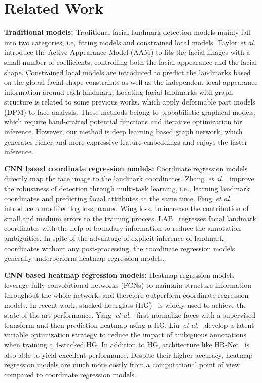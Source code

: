 \documentclass[runningheads]{llncs}
\begin{document}
\section{Related Work}
\textbf{Traditional models:} Traditional facial landmark detection models mainly fall into two categories, i.e, fitting models and constrained local models. Taylor \textit{et al.} introduce the Active Appearance Model (AAM) \cite{aam1}\cite{aam2} to fits the facial images with a small number of coefficients, controlling both the facial appearance and the facial shape. Constrained local models\cite{cls1}\cite{cls2} are introduced to predict the landmarks based on the global facial shape constraints as well as the independent local appearance information around each landmark.
Locating facial landmarks with graph structure is related to some previous works\cite{ghiasi2014occlusion}\cite{zhu2012face}\cite{valstar2010facial}, which apply deformable part models (DPM)\cite{felzenszwalb2009object} to face analysis.
These methods belong to probabilistic graphical models, which require hand-crafted potential functions and iterative optimization for inference. 
However, our method is deep learning based graph network, which generates richer and more expressive feature embeddings and enjoys the faster inference.

\textbf{CNN based coordinate regression models:} Coordinate regression models directly map the face image to the landmark coordinates.
Zhang~\textit{et al.}~\cite{TCDCN} improve the robustness of detection through multi-task learning, i.e., learning landmark coordinates and predicting facial attributes at the same time. 
Feng~\textit{et al.}~\cite{wing} introduce a modified log loss, named Wing loss, to increase the contribution of small and medium errors to the training process.
LAB~\cite{lab} regresses facial landmark coordinates with the help of boundary information to reduce the annotation ambiguities.
In spite of the advantage of explicit inference of landmark coordinates without any post-processing, the coordinate regression models generally underperform heatmap regression models.

\textbf{CNN based heatmap regression models:}  Heatmap regression models leverage fully convolutional networks (FCNs) to maintain structure information throughout the whole network, and therefore outperform coordinate regression models.
In recent work, stacked hourglass (HG)~\cite{HG} is widely used to achieve the state-of-the-art performance.
Yang~\textit{et al.}~\cite{HGAlign} first normalize faces with a supervised transform and then prediction heatmap using a HG.
Liu~\textit{et al.}~\cite{SemAlign} develop a latent variable optimization strategy to reduce the impact of ambiguous annotations when training a 4-stacked HG. 
In addition to HG, architecture like HR-Net~\cite{HRNet} is also able to yield excellent performance.  
Despite their higher accuracy, heatmap regression models are much more costly from a computational point of view compared to coordinate regression models.  
\end{document}
